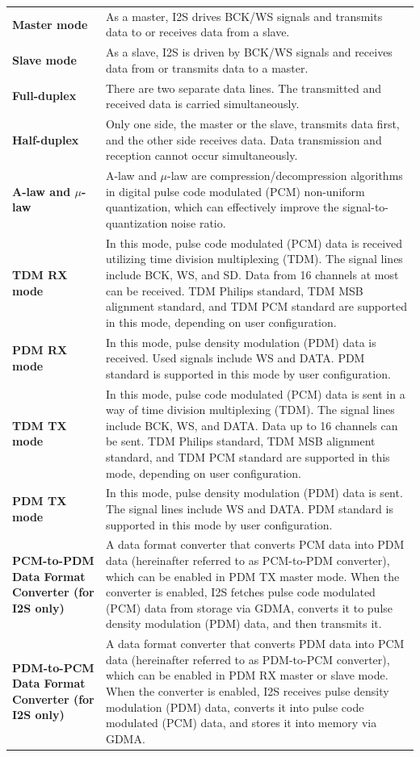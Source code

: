 \documentclass[main\_\_EN.tex]{subfiles}
\begin{document}
\begin{longtable}[c]{ R{4cm} p{10cm} }
\textbf{Master mode}     & As a master, I2S drives BCK/WS signals and transmits data to or receives data from a slave. \\ 
\textbf{Slave mode}      & As a slave, I2S is driven by BCK/WS signals and receives data from or transmits data to a master. \\
\textbf{Full-duplex} & There are two separate data lines. The transmitted and received data is carried simultaneously.\\
\textbf{Half-duplex} & Only one side, the master or the slave, transmits data first, and the other side receives data. Data transmission and reception cannot occur simultaneously.\\
\textbf{A-law and $\mu$-law} & A-law and \textrm{$\mu$}-law are compression/decompression algorithms in digital pulse code modulated (PCM) non-uniform quantization, which can effectively improve the signal-to-quantization noise ratio. \\
\textbf{TDM RX mode} & In this mode, pulse code modulated (PCM) data is received utilizing time division multiplexing (TDM). The signal lines include BCK, WS, and SD. Data from 16 channels at most can be received. TDM Philips standard, TDM MSB alignment standard, and TDM PCM standard are supported in this mode, depending on user configuration.\\
\textbf{PDM RX mode} & In this mode, pulse density modulation (PDM) data is received. Used signals include WS and DATA. PDM standard is supported in this mode by user configuration.\\
\textbf{TDM TX mode} & In this mode, pulse code modulated (PCM) data is sent in a way of time division multiplexing (TDM). The signal lines include BCK, WS, and DATA. Data up to 16 channels can be sent. TDM Philips standard, TDM MSB alignment standard, and TDM PCM standard are supported in this mode, depending on user configuration.\\
\textbf{PDM TX mode} & In this mode, pulse density modulation (PDM) data is sent. The signal lines include WS and DATA. PDM standard is supported in this mode by user configuration.\\
\textbf{PCM-to-PDM Data Format Converter (for I2S only)} & A data format converter that converts PCM data into PDM data (hereinafter referred to as PCM-to-PDM converter), which can be enabled in PDM TX master mode. When the converter is enabled, I2S fetches pulse code modulated (PCM) data from storage via GDMA, converts it to pulse density modulation (PDM) data, and then transmits it.\\
\textbf{PDM-to-PCM Data Format Converter (for I2S only)} & A data format converter that converts PDM data into PCM data (hereinafter referred to as PDM-to-PCM converter), which can be enabled in PDM RX master or slave mode. When the converter is enabled, I2S receives pulse density modulation (PDM) data, converts it into pulse code modulated (PCM) data, and stores it into memory via GDMA.\\
\end{longtable}
\end{document}
